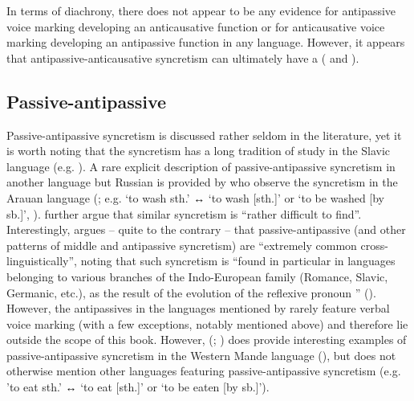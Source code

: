 In terms of diachrony, there does not appear to be any evidence for antipassive voice marking developing an anticausative function or for anticausative voice marking developing an antipassive function in any language. However, it appears that antipassive-anticausative syncretism can ultimately have a  ( and ).

\subsection{Passive-antipassive} \label{sec:simple-syncretism:pass-antp}
Passive-antipassive syncretism is discussed rather seldom in the literature, yet it is worth noting that the syncretism has a long tradition of study in the Slavic language  (e.g. \citealt{nedjalkov:silnickij:1969}). A rare explicit description of passive-antipassive syncretism in another language but Russian is provided by \cite[241]{zuniga:kittila:2019} who observe the syncretism in the Arauan language  (; e.g.  ‘to wash sth.’ ↔  ‘to wash [sth.]’ or ‘to be washed [by sb.]’, \citealt[298]{chapman:derbyshire:1991}). \cite[241]{zuniga:kittila:2019} further argue that similar syncretism is “rather difficult to find”. Interestingly, \cite[10]{creissels:2012} argues – quite to the contrary – that passive-antipassive (and other patterns of middle and antipassive syncretism) are “extremely common cross-linguistically”, noting that such syncretism is “found in particular in languages belonging to various branches of the Indo-European family (Romance, Slavic, Germanic, etc.), as the result of the evolution of the  reflexive pronoun ” (). However, the antipassives in the languages mentioned by \citeauthor{creissels:2012} rarely feature verbal voice marking (with a few exceptions, notably  mentioned above) and therefore lie outside the scope of this book. However, \citeauthor{creissels:2012} (\citeyear[10]{creissels:2012}; \citeyear[54]{creissels:2016}) does provide interesting examples of passive-antipassive syncretism in the Western Mande language  (), but does not otherwise mention other languages featuring passive-antipassive syncretism (e.g.   ’to eat sth.’ ↔  ‘to eat [sth.]’ or ‘to be eaten [by sb.]’).

